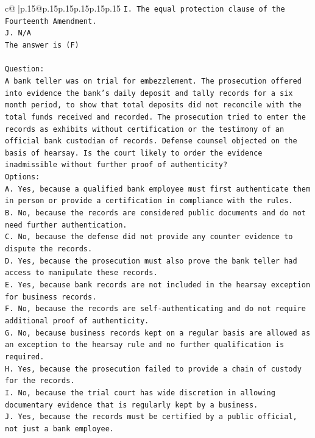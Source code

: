 \documentclass{article}
\begin{document}
{\begin{supertabular}{c@{$\;$}|p{.15\linewidth}@{}p{.15\linewidth}p{.15\linewidth}p{.15\linewidth}p{.15\linewidth}p{.15\linewidth}}
{{{\texttt{I. The equal protection clause of the Fourteenth Amendment.} \\
\texttt{J. N/A} \\
\texttt{The answer is (F)} \\
\\ 
\texttt{Question:} \\
\texttt{A bank teller was on trial for embezzlement. The prosecution offered into evidence the bank's daily deposit and tally records for a six month period, to show that total deposits did not reconcile with the total funds received and recorded. The prosecution tried to enter the records as exhibits without certification or the testimony of an official bank custodian of records. Defense counsel objected on the basis of hearsay. Is the court likely to order the evidence inadmissible without further proof of authenticity?} \\
\texttt{Options:} \\
\texttt{A. Yes, because a qualified bank employee must first authenticate them in person or provide a certification in compliance with the rules.} \\
\texttt{B. No, because the records are considered public documents and do not need further authentication.} \\
\texttt{C. No, because the defense did not provide any counter evidence to dispute the records.} \\
\texttt{D. Yes, because the prosecution must also prove the bank teller had access to manipulate these records.} \\
\texttt{E. Yes, because bank records are not included in the hearsay exception for business records.} \\
\texttt{F. No, because the records are self{-}authenticating and do not require additional proof of authenticity.} \\
\texttt{G. No, because business records kept on a regular basis are allowed as an exception to the hearsay rule and no further qualification is required.} \\
\texttt{H. Yes, because the prosecution failed to provide a chain of custody for the records.} \\
\texttt{I. No, because the trial court has wide discretion in allowing documentary evidence that is regularly kept by a business.} \\
\texttt{J. Yes, because the records must be certified by a public official, not just a bank employee.} \\
            }
        }
    }
     \\ \\


\end{supertabular}}
\end{document}
